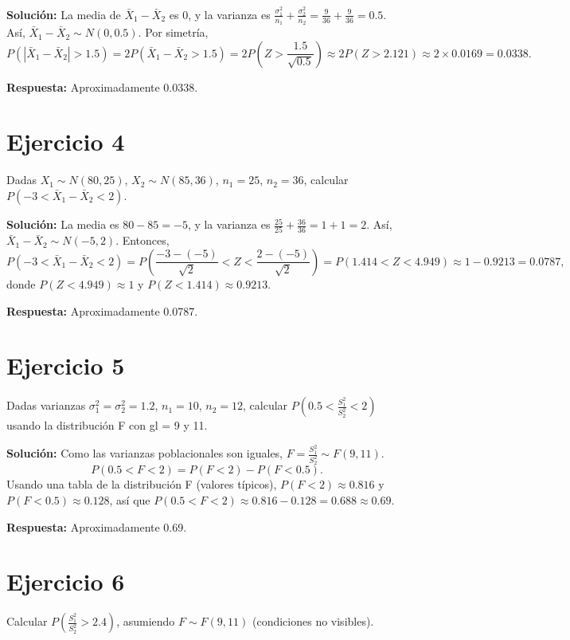 \documentclass{article}
\begin{document}
\textbf{Solución:}  
La media de $\bar{X}_1 - \bar{X}_2$ es $0$, y la varianza es $\frac{\sigma_1^2}{n_1} + \frac{\sigma_2^2}{n_2} = \frac{9}{36} + \frac{9}{36} = 0.5$. Así, $\bar{X}_1 - \bar{X}_2 \sim N(0, 0.5)$.  
Por simetría,  
\[ P(|\bar{X}_1 - \bar{X}_2| > 1.5) = 2 P\left( \bar{X}_1 - \bar{X}_2 > 1.5 \right) = 2 P\left( Z > \frac{1.5}{\sqrt{0.5}} \right) \approx 2 P(Z > 2.121) \approx 2 \times 0.0169 = 0.0338. \]

\textbf{Respuesta:} Aproximadamente 0.0338.

\section{Ejercicio 4}
Dadas $X_1 \sim N(80, 25)$, $X_2 \sim N(85, 36)$, $n_1 = 25$, $n_2 = 36$, calcular $P(-3 < \bar{X}_1 - \bar{X}_2 < 2)$.

\textbf{Solución:}  
La media es $80 - 85 = -5$, y la varianza es $\frac{25}{25} + \frac{36}{36} = 1 + 1 = 2$. Así, $\bar{X}_1 - \bar{X}_2 \sim N(-5, 2)$.  
Entonces,  
\[ P(-3 < \bar{X}_1 - \bar{X}_2 < 2) = P\left( \frac{-3 - (-5)}{\sqrt{2}} < Z < \frac{2 - (-5)}{\sqrt{2}} \right) = P(1.414 < Z < 4.949) \approx 1 - 0.9213 = 0.0787, \]
donde $P(Z < 4.949) \approx 1$ y $P(Z < 1.414) \approx 0.9213$.

\textbf{Respuesta:} Aproximadamente 0.0787.

\section{Ejercicio 5}
Dadas varianzas $\sigma_1^2 = \sigma_2^2 = 1.2$, $n_1 = 10$, $n_2 = 12$, calcular $P\left(0.5 < \frac{S_1^2}{S_2^2} < 2\right)$ usando la distribución F con gl = 9 y 11.

\textbf{Solución:}  
Como las varianzas poblacionales son iguales, $F = \frac{S_1^2}{S_2^2} \sim F(9, 11)$.  
\[ P(0.5 < F < 2) = P(F < 2) - P(F < 0.5). \]  
Usando una tabla de la distribución F (valores típicos), $P(F < 2) \approx 0.816$ y $P(F < 0.5) \approx 0.128$, así que $P(0.5 < F < 2) \approx 0.816 - 0.128 = 0.688 \approx 0.69$.

\textbf{Respuesta:} Aproximadamente 0.69.

\section{Ejercicio 6}
Calcular $P\left( \frac{S_1^2}{S_2^2} > 2.4 \right)$, asumiendo $F \sim F(9, 11)$ (condiciones no visibles).
\end{document}
